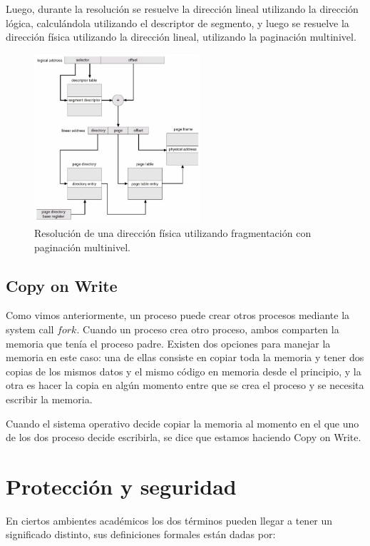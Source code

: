 \documentclass{article}
\begin{document}
Luego, durante la resolución se resuelve la dirección lineal utilizando la dirección lógica, calculándola utilizando el descriptor de segmento, y luego se resuelve la dirección física utilizando la dirección lineal, utilizando la paginación multinivel.

\begin{figure}[H]
    \centering
    \includegraphics[width=0.55\textwidth]{imgs/memory_paged_segmentation.png}
    \caption{Resolución de una dirección física utilizando fragmentación con paginación multinivel.}
    \label{fig:memory_paged_segmentation}
\end{figure}

\subsection{Copy on Write}

Como vimos anteriormente, un proceso puede crear otros procesos mediante la system call $fork$. Cuando un proceso crea otro proceso, ambos comparten la memoria que ten\'ia el proceso padre. Existen dos opciones para manejar la memoria en este caso: una de ellas consiste en copiar toda la memoria y tener dos copias de los mismos datos y el mismo c\'odigo en memoria desde el principio, y la otra es hacer la copia en alg\'un momento entre que se crea el proceso y se necesita escribir la memoria.

Cuando el sistema operativo decide copiar la memoria al momento en el que uno de los dos proceso decide escribirla, se dice que estamos haciendo Copy on Write.

\section{Protección y seguridad}

En ciertos ambientes académicos los dos términos pueden llegar a tener un significado distinto, sus definiciones formales están dadas por:
\end{document}
